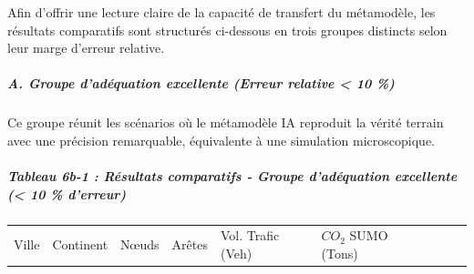 \documentclass[10pt, a4paper]{article}
\newcounter{none}
\begin{document}
Afin d'offrir une lecture claire de la capacité de transfert du
métamodèle, les résultats comparatifs sont structurés ci-dessous en
trois groupes distincts selon leur marge d'erreur relative.

\subparagraph{A. Groupe d'adéquation excellente (Erreur relative
\textless{} 10
\%)}\label{a.-groupe-daduxe9quation-excellente-erreur-relative-10}

Ce groupe réunit les scénarios où le métamodèle IA reproduit la vérité
terrain avec une précision remarquable, équivalente à une simulation
microscopique.

\subparagraph{Tableau 6b-1 : Résultats comparatifs - Groupe d'adéquation
excellente (\textless{} 10 \%
d'erreur)}\label{tableau-6b-1-ruxe9sultats-comparatifs---groupe-daduxe9quation-excellente-10-derreur}

{\def\LTcaptype{none} %
\begin{longtable}[]{@{}
  >{\raggedright\arraybackslash}p{}
  >{\centering\arraybackslash}p{}
  >{\centering\arraybackslash}p{}
  >{\centering\arraybackslash}p{}
  >{\centering\arraybackslash}p{}
  >{\centering\arraybackslash}p{}
  >{\centering\arraybackslash}p{}
  >{\centering\arraybackslash}p{}
  >{\centering\arraybackslash}p{}@{}}
\toprule\noalign{}
\begin{minipage}[b]{\linewidth}\raggedright
Ville
\end{minipage} & \begin{minipage}[b]{\linewidth}\centering
Continent
\end{minipage} & \begin{minipage}[b]{\linewidth}\centering
Nœuds
\end{minipage} & \begin{minipage}[b]{\linewidth}\centering
Arêtes
\end{minipage} & \begin{minipage}[b]{\linewidth}\centering
Vol. Trafic (Veh)
\end{minipage} & \begin{minipage}[b]{\linewidth}\centering
\(CO_2\) SUMO (Tons)
\end{minipage} & \begin{minipage}[b]{\linewidth}\centering

\end{minipage}
\end{longtable}}
\end{document}
